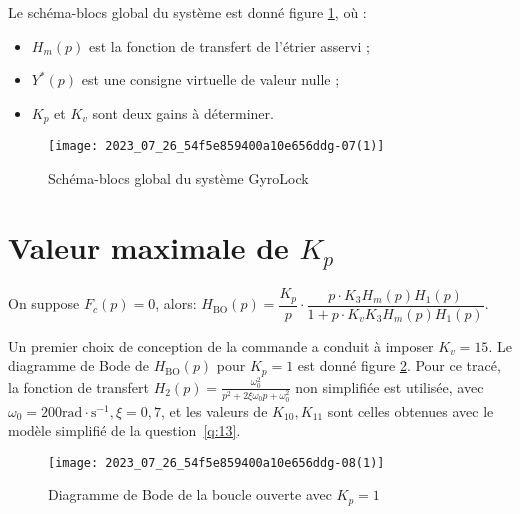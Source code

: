 Le schéma-blocs global du système est donné figure \ref{fig_ccspsi2022:11}, où :

\begin{itemize}
  \item $H_{m}(p)$ est la fonction de transfert de l'étrier asservi ;

  \item $Y^{*}(p)$ est une consigne virtuelle de valeur nulle ;

  \item $K_{p}$ et $K_{v}$ sont deux gains à déterminer.

\end{itemize}


\begin{figure}[!h]
\centering
\texttt{[image: 2023\_07\_26\_54f5e859400a10e656ddg-07(1)]}
\caption{\label{fig_ccspsi2022:11}Schéma-blocs global du système GyroLock}
\end{figure}
\fi

\section{\label{sec:III.A} Valeur maximale de $K_{p}$}
\ifprof
\begin{corrige}
On suppose $F_c(p) = 0$, alors: $\boxed{H_{\text{BO}}(p) = \dfrac{K_p}{p} \cdot \dfrac{p\cdot K_3 H_m(p) H_1(p)}{1+p\cdot K_vK_3 H_m(p) H_1(p)}}$. 
\end{corrige}
\else
\fi

\ifprof
\else

Un premier choix de conception de la commande a conduit à imposer $K_{v}=15$. Le diagramme de Bode de $H_{\mathrm{BO}}(p)$ pour $K_{p}=1$ est donné figure \ref{fig_ccspsi2022:12}. Pour ce tracé, la fonction de transfert $H_{2}(p)=\frac{\omega_{0}^{2}}{p^{2}+2 \xi \omega_{0} p+\omega_{0}^{2}}$ non simplifiée est utilisée, avec $\omega_{0}=200 \mathrm{rad} \cdot \mathrm{s}^{-1}, \xi=0,7$, et les valeurs de $K_{10}, K_{11}$ sont celles obtenues avec le modèle simplifié de la question~\ref{q:13}.


\begin{figure}[!h]
\centering
\texttt{[image: 2023\_07\_26\_54f5e859400a10e656ddg-08(1)]}
\caption{\label{fig_ccspsi2022:12}Diagramme de Bode de la boucle ouverte avec $K_{p}=1$}
\end{figure}
\fi


